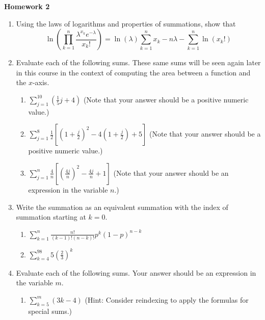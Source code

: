 \documentclass{article}
\begin{document}
    
    \begin{center}
        \large \textbf{Homework 2}
    \end{center}
                    \begin{enumerate}
                        \item Using the laws of logarithms and properties of summations, show that $$\ln\left(\prod_{k=1}^n \frac{\lambda^{x_k}e^{-\lambda}}{x_k!}\right)=\ln(\lambda)\sum_{k=1}^n x_k -n\lambda - \sum_{k=1}^n \ln(x_k!)$$
                        \item Evaluate each of the following sums.  These same sums will be seen again later in this course in the context of computing the area between a function and the $x$-axis.
                            \begin{enumerate}
                                \item $\displaystyle \sum_{j=1}^{10} \left(\frac{1}{5}j+4\right)$  (Note that your answer should be a positive numeric value.)
                                \item $\displaystyle \sum_{j=1}^{8} \frac{1}{2}\left[\left(1+\frac{j}{2} \right)^2 -4\left( 1+ \frac{j}{2}\right) + 5\right]$  (Note that your answer should be a positive numeric value.)
                                \item $\displaystyle \sum_{j=1}^{n} \frac{4}{n}\left[ \left(\frac{4j}{n}\right)^2 - \frac{4j}{n} + 1 \right]$  (Note that your answer should be an expression in the variable $n$.)
                            \end{enumerate}
                        \item Write the summation as an equivalent summation with the index of summation starting at $k=0$.
                            \begin{enumerate}
                                \item $\displaystyle \sum_{k=1}^n \frac{n!}{(k-1)!(n-k)!}p^k(1-p)^{n-k}$
                                \item $\displaystyle \sum_{k=4}^{98} 5\left(\frac{2}{3}\right) ^k$
                            \end{enumerate}
                        \item Evaluate each of the following sums.  Your answer should be an expression in the variable $m$.
                            \begin{enumerate}
                                \item $\displaystyle \sum_{k=5}^{m} (3k-4)$  (Hint: Consider reindexing to apply the formulas for special sums.)

\end{enumerate}
\end{enumerate}
\end{document}
